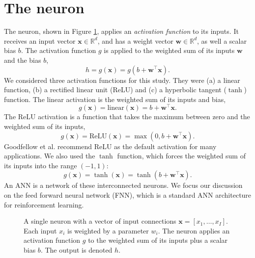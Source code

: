 \section{The neuron}
The neuron, shown in Figure \ref{fig:neuron}, applies an \emph{activation function} to its inputs.
It receives an input vector $\bm{x} \in \mathbb{R}^d$, and has a weight vector $\mathbf{w} \in \mathbb{R}^d$, as well a scalar bias $b$.
The activation function $g$ is applied to the weighted sum of its inputs $\mathbf{w}$ and the bias $b$,
\begin{equation}
    h = g(\bm{x}) = g(b + \mathbf{w}^\intercal \bm{x}).
    \label{eq:activation}
\end{equation}
We considered three activation functions for this study. They were (a) a linear function, (b) a rectified linear unit (ReLU) and (c) a hyperbolic tangent ($\tanh$) function.
The linear activation is the weighted sum of its inputs and bias,
\begin{equation}
    g(\bm{x}) = \text{linear}(\bm{x}) = b + \mathbf{w}^\intercal \bm{x}.
    \label{eq:linear}
\end{equation}
The ReLU activation is a function that takes the maximum between zero and the weighted sum of its inputs,
\begin{equation}
    g(\bm{x}) = \text{ReLU}(\bm{x}) = \max(0, b + \mathbf{w}^\intercal \bm{x}).
    \label{eq:ReLU}
\end{equation}
Goodfellow et al. \cite{Goodfellow2016} recommend ReLU as the default activation for many applications.
We also used the $\tanh$ function, which forces the weighted sum of its inputs into the range $(-1,1)$:
\begin{equation}
    g(\bm{x}) = \tanh(\bm{x}) = \tanh(b + \mathbf{w}^\intercal \bm{x}).
    \label{eq:tanh}
\end{equation}
An ANN is a network of these interconnected neurons. We focus our discussion on the feed forward neural network (FNN), which is a standard ANN architecture for reinforcement learning.

\begin{figure}[htb!]
    \centering
    
    \caption[A single neuron]{A single neuron with a vector of input connections $\bm{x} = [x_1,\ldots,x_I]$. Each input $x_i$ is weighted by a parameter $w_i$. The neuron applies an activation function $g$ to the weighted sum of its inputs plus a scalar bias $b$. The output is denoted $h$.}
    \label{fig:neuron}
\end{figure}

